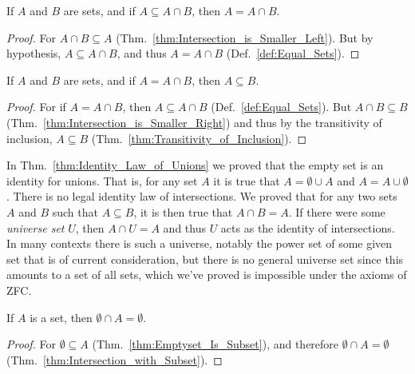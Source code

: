         \begin{theorem}
            \label{thm:Conv_Intersection_with_Subset}%
            If $A$ and $B$ are sets, and if $A\subseteq{A}\cap{B}$, then
            $A=A\cap{B}$.
        \end{theorem}
        \begin{proof}
            For $A\cap{B}\subseteq{A}$
            (Thm.~\ref{thm:Intersection_is_Smaller_Left}). But by hypothesis,
            $A\subseteq{A}\cap{B}$, and thus $A=A\cap{B}$
            (Def.~\ref{def:Equal_Sets}).
        \end{proof}
        \begin{theorem}
            \label{thm:Intersection_is_Equal}%
            If $A$ and $B$ are sets, and if $A=A\cap{B}$, then $A\subseteq{B}$.
        \end{theorem}
        \begin{proof}
            For if $A=A\cap{B}$, then $A\subseteq{A}\cap{B}$
            (Def.~\ref{def:Equal_Sets}). But $A\cap{B}\subseteq{B}$
            (Thm.~\ref{thm:Intersection_is_Smaller_Right}) and thus by the
            transitivity of inclusion, $A\subseteq{B}$
            (Thm.~\ref{thm:Transitivity_of_Inclusion}).
        \end{proof}
        In Thm.~\ref{thm:Identity_Law_of_Unions} we proved that the empty set is
        an identity for unions. That is, for any set $A$ it is true that
        $A=\emptyset\cup{A}$ and $A=A\cup\emptyset$. There is no legal identity
        law of intersections. We proved
        that for any two sets $A$ and $B$ such that $A\subseteq{B}$, it is then
        true that $A\cap{B}=A$. If there were some \textit{universe set} $U$,
        then $A\cap{U}=A$ and thus $U$ acts as the identity of intersections. In
        many contexts there is such a universe, notably the power set of some
        given set that is of current consideration, but there is no general
        universe set since this amounts to a set of all sets, which we've proved
        is impossible under the axioms of ZFC.
        \begin{theorem}
            \label{thm:Intersection_with_Emptyset}%
            If $A$ is a set, then $\emptyset\cap{A}=\emptyset$.
        \end{theorem}
        \begin{proof}
            For $\emptyset\subseteq{A}$ (Thm.~\ref{thm:Emptyset_Is_Subset}), and
            therefore $\emptyset\cap{A}=\emptyset$
            (Thm.~\ref{thm:Intersection_with_Subset}).
        \end{proof}

